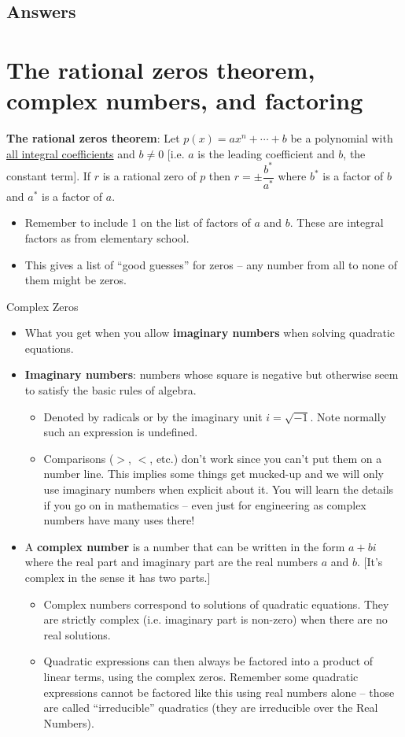 \documentclass{amsbook}
\numberwithin{section}{chapter}
\numberwithin{equation}{chapter}
\newcommand{\qi}[1]{\begin{itemize}\item #1 \end{itemize}}
\begin{document}
\subsection*{Answers \nopunct} \hfill
\begin{multicols}{2}
	
\end{multicols}

\newpage
\section{The rational zeros theorem, complex numbers, and factoring}

\textbf{The rational zeros theorem}: Let $p(x) = ax^n + \cdots + b$ be a polynomial with \underline{all integral coefficients} and $b\neq0$ [i.e. $a$ is the leading coefficient and $b$, the constant term]. If $r$ is a rational zero of $p$ then $r = \pm \dfrac{b^*}{a^*}$ where $b^*$ is a factor of $b$ and $a^*$ is a factor of $a$.

\qi{Remember to include 1 on the list of factors of $a$ and $b$. These are integral factors as from elementary school.}
\qi{This gives a list of ``good guesses'' for zeros -- any number from all to none of them might be zeros.}

Complex Zeros
\begin{itemize}
	\item What you get when you allow \textbf{imaginary numbers}  when solving quadratic equations.
	\item \textbf{Imaginary numbers}: numbers whose square is negative but otherwise seem to satisfy the basic rules of algebra.
	\qi{Denoted by radicals or by the imaginary unit $i=\sqrt{-1}$. Note normally such an expression is undefined.} 
	\qi{Comparisons ($>$, $<$, etc.) don't work since you can't put them on a number line. This implies some things get mucked-up and we will only use imaginary numbers when explicit about it. You will learn the details if you go on in mathematics -- even just for engineering as complex numbers have many uses there!}
	\item A \textbf{complex number} is a number that can be written in the form $a+bi$ where the real part and imaginary part are the real numbers $a$ and $b$. [It's complex in the sense it has two parts.]
	\qi{Complex numbers correspond to solutions of quadratic equations. They are strictly complex (i.e. imaginary part is non-zero) when there are no real solutions.}
	\qi{Quadratic expressions can then always be factored into a product of linear terms, using the complex zeros. Remember some quadratic expressions cannot be factored like this using real numbers alone -- those are called ``irreducible'' quadratics (they are irreducible over the Real Numbers).}
\end{itemize}
\end{document}
